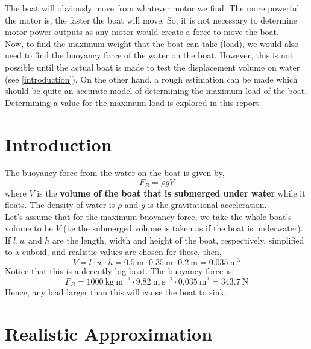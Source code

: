 \documentclass{article}
\begin{document}
The boat will obviously move from whatever motor we find. The more powerful the motor is, the faster the boat will move. So, it is not necessary to determine motor power outputs as any motor would create a force to move the boat. \\

Now, to find the maximum weight that the boat can take (load), we would also need to find the buoyancy force of the water on the boat. However, this is not possible until the actual boat is made to test the displacement volume on water (see \ref{introduction}). On the other hand, a rough estimation can be made which should be quite an accurate model of determining the maximum load of the boat. Determining a value for the maximum load is explored in this report.

\newpage

\section*{Introduction}
\label{introduction}

The buoyancy force from the water on the boat is given by,
$$F_B=\rho gV$$
where $V$ is the \textbf{volume of the boat that is submerged under water} while it floats. The density of water is $\rho$ and $g$ is the gravitational acceleration. \\

Let's assume that for the maximum buoyancy force, we take the whole boat's volume to be $V$ (i.e the submerged volume is taken as if the boat is underwater). If $l, w$ and $h$ are the length, width and height of the boat, respectively, simplified to a cuboid, and realistic values are chosen for these, then,
$$V=l\cdot w\cdot h=0.5\ \mathrm{m}\cdot 0.35\ \mathrm{m}\cdot 0.2\ \mathrm{m}=0.035\ \mathrm{m^3}$$
Notice that this is a decently big boat. The buoyancy force is,
$$F_B=1000\ \mathrm{kg\ m^{-3}}\cdot9.82\ \mathrm{m\ s^{-2}}\cdot0.035\ \mathrm{m^3}=343.7\ \mathrm{N}$$
Hence, any load larger than this will cause the boat to sink. \\[1cm]

\section*{Realistic Approximation}
\end{document}
